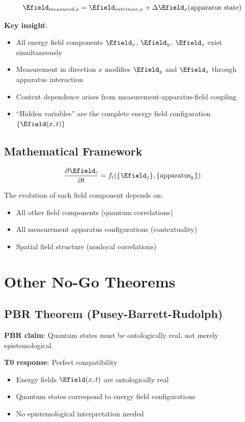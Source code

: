 	\begin{equation}
		\Efield_{measured,x} = \Efield_{intrinsic,x} + \Delta\Efield_x(\text{apparatus state})
	\end{equation}
	
	\textbf{Key insight}: 
	\begin{itemize}
		\item All energy field components $\Efield_x$, $\Efield_y$, $\Efield_z$ exist simultaneously
		\item Measurement in direction $x$ modifies $\Efield_y$ and $\Efield_z$ through apparatus interaction
		\item Context dependence arises from measurement-apparatus-field coupling
		\item ``Hidden variables'' are the complete energy field configuration $\{\Efield(x,t)\}$
	\end{itemize}
	
	\subsection{Mathematical Framework}
	
	\begin{equation}
		\frac{\partial \Efield_i}{\partial t} = f_i(\{\Efield_j\}, \{\text{apparatus}_k\})
	\end{equation}
	
	The evolution of each field component depends on:
	\begin{itemize}
		\item All other field components (quantum correlations)
		\item All measurement apparatus configurations (contextuality)
		\item Spatial field structure (nonlocal correlations)
	\end{itemize}
	
	\section{Other No-Go Theorems}
	
	\subsection{PBR Theorem (Pusey-Barrett-Rudolph)}
	
	\textbf{PBR claim}: Quantum states must be ontologically real, not merely epistemological.
	
	\textbf{T0 response}: Perfect compatibility
	\begin{itemize}
		\item Energy fields $\Efield(x,t)$ are ontologically real
		\item Quantum states correspond to energy field configurations
		\item No epistemological interpretation needed
	\end{itemize}
	
